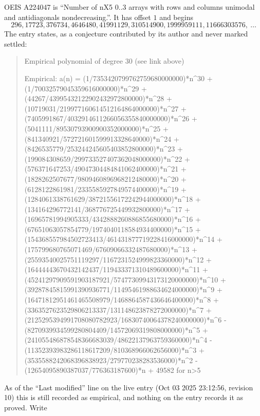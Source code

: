 \documentclass[11pt,a4paper]{article}
\theoremstyle{plain}
\theoremstyle{definition}
\begin{document}
OEIS A224047 is ``Number of nX5 0..3 arrays with rows and columns unimodal and antidiagonals nondecreasing.''. It has offset $1$ and begins
\[
296, 17723, 376734, 4646480, 41991129, 310514900, 1999959111, 11666303576,\ \dots
\]
The entry states, as a conjecture contributed by its author and never marked settled:
\begin{quote}
Empirical polynomial of degree 30 (see link above)

Empirical: a(n) = (1/7353420799762759680000000)*n\^{}30 + (1/70032579045359616000000)*n\^{}29 + (44267/43995432122902432972800000)*n\^{}28 + (10719031/219977160614512164864000000)*n\^{}27 + (7405991867/4032914611266056355840000000)*n\^{}26 + (5041111/89530793900900352000000)*n\^{}25 + (841340921/572721601599913328640000)*n\^{}24 + (8426535779/253244245605403852800000)*n\^{}23 + (199084308659/299733527407362048000000)*n\^{}22 + (576371647253/49047304484841062400000)*n\^{}21 + (1828262507677/9809460896968212480000)*n\^{}20 + (6128122861981/2335585927849574400000)*n\^{}19 + (1284061338761629/38721556172242944000000)*n\^{}18 + (134164296772141/368776725449932800000)*n\^{}17 + (16965781994905333/4342888260886855680000)*n\^{}16 + (67651063057854779/1974040118584934400000)*n\^{}15 + (154368557984502723413/461431877719228416000000)*n\^{}14 + (175799680765071469/67609066332487680000)*n\^{}13 + (25593540025751119297/1167231524999823360000)*n\^{}12 + (16444443670432142437/119433371310489600000)*n\^{}11 + (45241297909591903187921/57477309943173120000000)*n\^{}10 + (39287845815991390936771/11495461988634624000000)*n\^{}9 + (16471812951461465508979/1468864587436646400000)*n\^{}8 + (3363527623529806213337/131148623878272000000)*n\^{}7 + (2125295394991708080782923/16830740064378240000000)*n\^{}6 - (8270939934599280804409/14572069319808000000)*n\^{}5 + (241055486878548366683039/48622137963759360000)*n\^{}4 - (11352393983286118617209/810368966062656000)*n\^{}3 + (3535588242068396838923/279770238283536000)*n\^{}2 - (12654095890387037/776363187600)*n + 49582 for n>5
\end{quote}
As of the ``Last modified'' line on the live entry (Oct 03 2025 23:12:56, revision 10) this is still
recorded as empirical, and nothing on the entry records it as proved. Write
\end{document}
